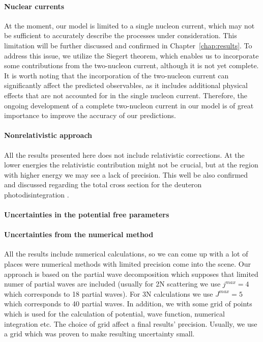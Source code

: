     \paragraph{Nuclear currents}
    At the moment, our model is limited to a single nucleon current, which may not be sufficient to accurately describe the processes under consideration.  This limitation will be further discussed and confirmed in
    Chapter~\ref{chap:results}. To address this issue, we utilize the Siegert theorem, which enables us to
    incorporate some contributions from the two-nucleon current, although it is not yet complete. It is worth noting
    that the incorporation of the two-nucleon current can significantly affect the predicted observables, as it
    includes additional physical effects that are not accounted for in the single nucleon current. Therefore, the
    ongoing development of a complete two-nucleon current in our model
    is of great importance to improve the accuracy of our predictions.

    \paragraph{Nonrelativistic approach}
    All the results presented here does not include relativistic corrections.
    At the lower energies the relativistic contribution might not be crucial,
    but at the region with higher energy we may see a lack of precision.
    This well be also confirmed and discussed regarding the total cross section
    for the deuteron photodisintegration .
    
    \paragraph{Uncertainties in the potential free parameters}

    \paragraph{Uncertainties from the numerical method}
    All the results include numerical calculations,
    so we can come up with a lot of places were numerical methods with limited 
    precision come into the scene. 
    Our approach is based on the partial wave decomposition which
    supposes that limited numer of partial waves are included 
    (usually for 2N scattering we use $j^{max}=4$ which corresponds to 18 partial waves).
    For 3N calculations we use $J^{max}=5$ which corresponds to 40 partial waves.
    In addition, we with some 
    grid of points which is used for the calculation of potential, wave function, numerical integration etc. 
    The choice of grid affect
    a final results' precision. 
    Usually, we use a grid {} which was proven to make resulting
    uncertainty small.

